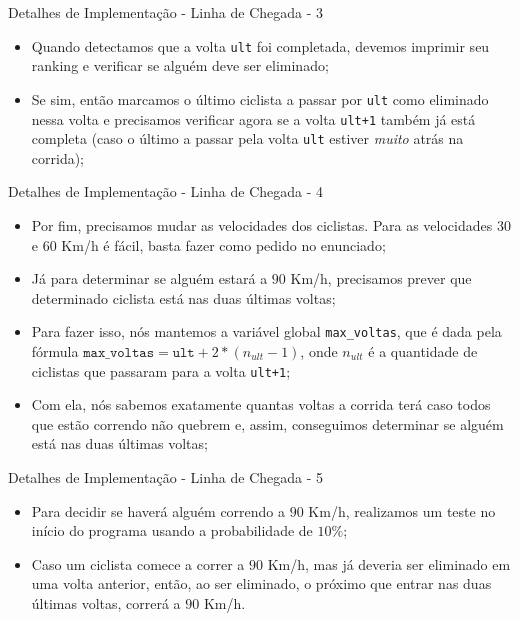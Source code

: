 \documentclass[10pt]{beamer}
\begin{document}
    \begin{frame}{Detalhes de Implementação - Linha de Chegada - 3}
      \begin{itemize}
        \justifying
      \item Quando detectamos que a volta \texttt{ult} foi completada, devemos
        imprimir seu ranking e verificar se alguém deve ser eliminado;
      \item Se sim, então marcamos o último ciclista a passar por \texttt{ult}
        como eliminado nessa volta e precisamos verificar agora se a volta
        \texttt{ult+1} também já está completa (caso o último a passar
        pela volta \texttt{ult} estiver \textit{muito} atrás na corrida);
      \end{itemize}
    \end{frame}

  \begin{frame}{Detalhes de Implementação - Linha de Chegada - 4}
      \begin{itemize}
        \justifying
      \item Por fim, precisamos mudar as velocidades dos ciclistas. Para as
        velocidades $30$ e $60$ Km/h é fácil, basta fazer como pedido no
        enunciado;
      \item Já para determinar se alguém estará a $90$ Km/h, precisamos prever
        que determinado ciclista está nas duas últimas voltas;
      \item Para fazer isso, nós mantemos a variável global \texttt{max\_voltas},
        que é dada pela fórmula $\texttt{max\_voltas} = \texttt{ult} + 2 *
        (n_{ult}-1)$, onde $n_{ult}$ é a quantidade de ciclistas que passaram
        para a volta \texttt{ult+1};
      \item Com ela, nós sabemos exatamente quantas voltas a corrida terá caso
        todos que estão correndo não quebrem e, assim, conseguimos determinar se
        alguém está nas duas últimas voltas;
      \end{itemize}
    \end{frame}

    \begin{frame}{Detalhes de Implementação - Linha de Chegada - 5}
      \begin{itemize}
        \item Para decidir se haverá alguém correndo a $90$ Km/h, realizamos um
          teste no início do programa usando a probabilidade de $10\%$;
        \item Caso um ciclista comece a correr a $90$ Km/h, mas já deveria ser
          eliminado em uma volta anterior, então, ao ser eliminado, o próximo
          que entrar nas duas últimas voltas, correrá a $90$ Km/h.
      \end{itemize}
    \end{frame}
\end{document}
